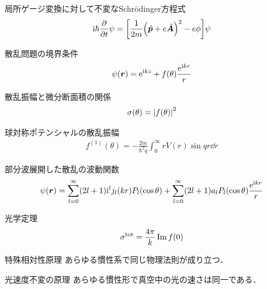 \documentclass{report}
\begin{document}
\begin{itembox}[l]{局所ゲージ変換に対して不変なSchrödinger方程式}
  \begin{align}
    \mathrm{i}\hbar\pdv{t}\psi = \qty[\frac{1}{2m}\qty(\hat{\bm{p}} + e\hat{\bm{A}})^2 - e\phi]\psi
  \end{align}
\end{itembox}

\begin{itembox}[l]{散乱問題の境界条件}
  \begin{equation}
    \psi(\bm{r}) = \mathrm{e}^{\mathrm{i} kz} + f(\theta) \frac{\mathrm{e}^{\mathrm{i} kr}}{r}
  \end{equation}
\end{itembox}

\begin{itembox}[l]{散乱振幅と微分断面積の関係}
  \begin{align}
    \sigma(\theta) = \abs{f(\theta)}^2
  \end{align}
\end{itembox}

\begin{itembox}[l]{球対称ポテンシャルの散乱振幅}
  \begin{align}
    \label{SCamp1st}
    f^{(1)}(\theta) =  -\frac{2m}{\hbar^2 q} \int_{0}^{\infty} rV(r)\sin qr \dd{r}
  \end{align}
 \end{itembox} 

 \begin{itembox}[l]{部分波展開した散乱の波動関数}
  \begin{align}
    \label{PartialWave}
    \psi(\bm{r}) = \sum_{l=0}^{\infty} (2l+1)\mathrm{i}^l j_l(kr)P_l(\cos\theta) + \sum_{l=0}^{\infty} (2l+1)a_l P_l(\cos\theta) \frac{\mathrm{e}^{\mathrm{i} kr}}{r}
  \end{align}
  \end{itembox}

  \begin{itembox}[l]{光学定理}
    \begin{align}
      \sigma^{\mathrm{tot}} = \frac{4\pi}{k} \Im f(0)
    \end{align}
  \end{itembox}

  \begin{itembox}[l]{特殊相対性原理}
    あらゆる慣性系で同じ物理法則が成り立つ．
  \end{itembox}

  \begin{itembox}[l]{光速度不変の原理}
    あらゆる慣性形で真空中の光の速さは同一である．
  \end{itembox}
\end{document}
